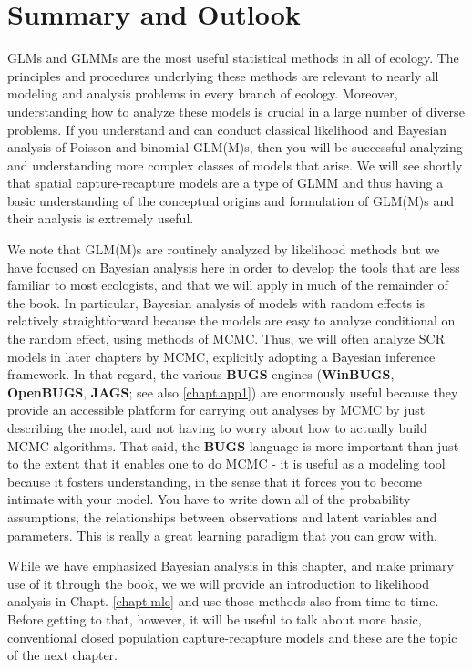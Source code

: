 \section{ Summary and Outlook}

GLMs and GLMMs are the most useful statistical methods in all of
ecology. The principles and procedures underlying these methods are
relevant to nearly all modeling and analysis problems in every branch
of ecology. Moreover, understanding how to analyze these models is
crucial in a large number of diverse problems. If you understand and
can conduct classical likelihood and Bayesian analysis of Poisson and
binomial GLM(M)s, then you will be successful analyzing and
understanding more complex classes of models that arise. We will see
shortly that spatial capture-recapture models are a type of GLMM
and thus having a basic
understanding of the conceptual origins and formulation of GLM(M)s and
their analysis is extremely useful.

We note that GLM(M)s are routinely
analyzed by likelihood methods but we have focused on Bayesian
analysis here in order to develop the tools that are less familiar to
most ecologists, and that we will apply in much of the remainder of the book.  In particular, Bayesian analysis of models with random
effects is relatively straightforward because the models
are easy to analyze conditional on the random effect, using methods of
MCMC.  Thus, we will often analyze SCR models in later chapters by
MCMC, explicitly adopting a Bayesian inference framework.
In that regard, the various {\bf BUGS} engines ({\bf WinBUGS}, {\bf
  OpenBUGS}, {\bf JAGS}; see also \ref{chapt.app1}) are enormously useful because they
provide an accessible platform for
carrying out  analyses by MCMC by just
describing the model, and not having to worry about how to actually
build MCMC algorithms.  That said, the {\bf BUGS} language is more important
than just to the extent that it enables one to do MCMC - it is useful
as a modeling tool because it fosters understanding, in the sense that
it forces you to become intimate with your model. You have to write
down all of the probability assumptions, the relationships between
observations and latent variables and parameters. This is really a
great learning paradigm that you can grow with.

While we have emphasized Bayesian analysis in this chapter, and make
primary use of it through the book, we
we will provide an introduction to likelihood analysis in Chapt.
\ref{chapt.mle} and use those  methods also from time to time.
 Before getting to that, however, it will be useful to
talk about more basic, conventional closed population
capture-recapture models and these are the topic of the next chapter.
